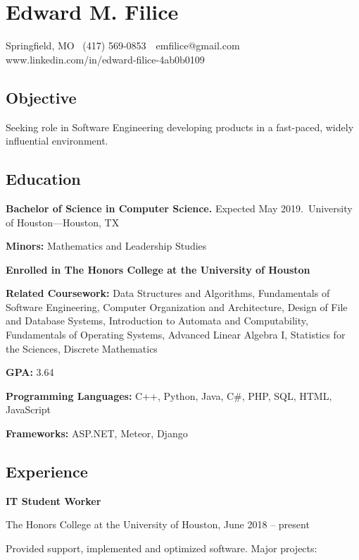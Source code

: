 \documentclass{article}
\begin{document}
\noindent 
\section*{Edward M. Filice}

\noindent Springfield, MO~{\textbar} (417) 569-0853~{\textbar}~emfilice@gmail.com {\textbar} www.linkedin.com/in/edward-filice-4ab0b0109

\noindent 
\subsection*{Objective}

\noindent Seeking role in Software Engineering developing products in a fast-paced, widely influential environment.

\noindent 
\subsection*{Education}

\noindent \textbf{Bachelor of Science in Computer Science.} Expected May 2019.~University of Houston---Houston, TX

{\addtolength{\leftskip}{10mm}
\noindent\textbf{Minors:} Mathematics and Leadership Studies

\noindent\textbf{Enrolled in The Honors College at the University of Houston}

\noindent\textbf{Related Coursework:} Data Structures and Algorithms, Fundamentals of Software Engineering, Computer Organization and Architecture, Design of File and Database Systems, Introduction to Automata and Computability, Fundamentals of Operating Systems, Advanced Linear Algebra I, Statistics for the Sciences, Discrete Mathematics


\noindent\textbf{GPA:} 3.64

\noindent\textbf{Programming Languages:} C++, Python, Java, C\#, PHP, SQL, HTML, JavaScript

\noindent\textbf{Frameworks:} ASP.NET, Meteor, Django

}
\noindent 
\subsection*{Experience}

\noindent \textbf{IT Student Worker}

\noindent The Honors College at the University of Houston, June 2018 -- present

\noindent Provided support, implemented and optimized software. Major projects:
\end{document}
